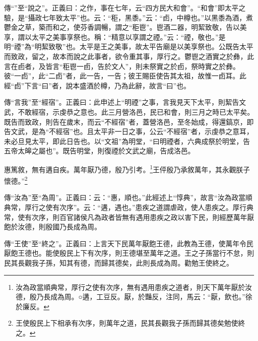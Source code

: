 {\noindent\zhuan{}\fzbyks 傳“”至“說之”。正義曰：之作，事在七年，云“四方民大和會”。“和會”即太平之驗，是“攝政七年致太平”也。云：“秬，黑黍。”云：“卣，中樽也。”以黑黍為酒，煮鬱金之草，築而和之，使芬香調暢，謂之“秬鬯”。鬯酒二器，明絜致敬，告以美享，謂以太平之美事享祭也。稱：“精意以享謂之禋。”云：“禋，敬也。”是明“禋”為“明絜致敬”也。太平是王之美事，故太平告廟是以美享祭也。公既告太平而致政，留之，故本而說之此事者，欲令重其事，厚行之。鬱鬯之酒實之於彝，此言在卣者，及皆言“秬鬯一卣，告於文人”，則未祭實之於卣，祭時實之於彝。彼“一卣”，此“二卣”者，此一告，一告；彼王賜臣使告其太祖，故惟一卣耳。此經“卣”下言“曰”者，說本盛酒於樽，乃為此辭，故言“曰”也。 \par}

{\noindent\zhuan{}\fzbyks 傳“言我”至“經宿”。正義曰：此申述上“明禋”之事，言我見天下太平，則絜告文武，不敢經宿，示虔恭之意也。此三月營洛邑，民已和會，則三月之時已太平矣。既告而致政，則告在歲末，而云“不經宿”者，蓋營洛邑，至冬始成，得還鎬京，即告文武，是為“不經宿”也。且太平非一日之事，公云“不經宿”者，示虔恭之意耳，未必旦見太平，即此日告也。以“文祖”為明堂，“曰明禋者，六典成祭於明堂，告五帝太皞之屬也”。既告明堂，則復禋於文武之廟，告成洛邑。 \par}

惠篤敘，無有遘自疾。萬年厭乃德，殷乃引考。\footnote{汝為政當順典常，厚行之使有次序，無有遇用患疾之道者，則天下萬年厭於汝德，殷乃長成為周。○遘，工豆反。厭，於豔反，注同，馬云：“厭，飲也。”徐於廉反。}王伻殷乃承敘萬年，其永觀朕子懷德。”\footnote{王使殷民上下相承有次序，則萬年之道，民其長觀我子孫而歸其德矣勉使終之。}

{\noindent\zhuan{}\fzbyks 傳“汝為”至“為周”。正義曰：云：“惠，順也。”此經述上“惇典”，故言“汝為政當順典常，厚行之使有次序”。云：“遘，遇也。”患疾之道謂虐政，使人患疾之。厚行典常，使有次序，則百官諸侯凡為政者皆無有遇用患疾之政以害下民，則經歷萬年厭飽於汝德，則殷國乃長成為周。 \par}

{\noindent\zhuan{}\fzbyks 傳“王使”至“終之”。正義曰：上言天下民萬年厭飽王德，此教為王德，使萬年令民厭飽王德也。能使殷民上下有次序，則王德堪至萬年之道。王之子孫當行不怠，則民其長觀我子孫，知其有德，而歸其德矣，此則長成為周。勸勉王使終之。 \par}

